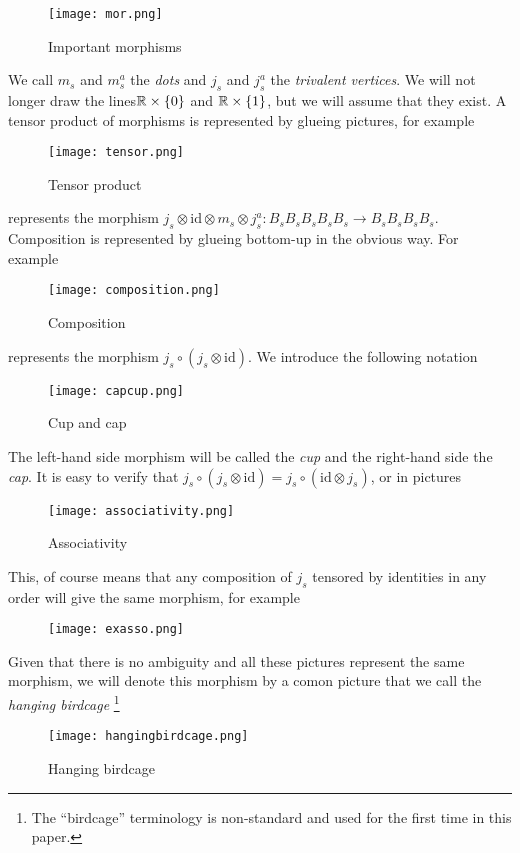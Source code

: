 \documentclass[12pt]{wart}
\theoremstyle{remark}
\begin{document}
 \begin{figure}[H] 
\begin{center}
 \texttt{[image: mor.png]} 
\caption{Important morphisms}  
\end{center}
\end{figure} 
We call $m_s$ and $m_s^a$ the \emph{dots} and $j_s$ and $j_s^a$ the \emph{trivalent vertices}. We will not longer draw the lines$\mathbb R \times \{0\}$ and $\mathbb R \times \{1\}$, but we will assume that they exist. 
A tensor product of morphisms is represented by glueing pictures, for example
 \begin{figure}[H] 
\begin{center}
 \texttt{[image: tensor.png]} 
\caption{Tensor product}  
\end{center}
\end{figure} 
 represents the morphism 
$ j_s\otimes \mathrm{id}\otimes m_s\otimes j_s^a:B_sB_sB_sB_sB_s\rightarrow B_sB_sB_sB_s$.
Composition is represented by glueing  bottom-up in the obvious way. For example 
 \begin{figure}[H] \begin{center}
 \texttt{[image: composition.png]} 
\caption{Composition}  
\end{center}
\end{figure} 
represents the morphism $j_s\circ (j_s\otimes \mathrm{id})$. 
 We introduce the following notation 
\begin{figure}[H] \begin{center}
 \texttt{[image: capcup.png]} 
\caption{Cup and cap}  
\end{center}
\end{figure} 
The left-hand side morphism will be called the \emph{cup} and the right-hand side the \emph{cap}. It is easy to verify that $j_s\circ (j_s\otimes \mathrm{id})=j_s\circ ( \mathrm{id}\otimes j_s)$, or in pictures 
\begin{figure}[H] \begin{center}
 \texttt{[image: associativity.png]} 
\caption{Associativity}  
\end{center}
\end{figure} 
This, of course means that any composition of $j_s$ tensored by identities in any order will give the same morphism, for example 
\begin{figure}[H] \begin{center}
 \texttt{[image: exasso.png]} 
\end{center}
\end{figure} 
Given that there is no ambiguity and all these pictures represent the same morphism, we will denote this morphism by a comon picture that we call the \emph{hanging birdcage} \footnote{The ``birdcage'' terminology is non-standard and used for the first time in this paper.}
\begin{figure}[H] \begin{center}
 \texttt{[image: hangingbirdcage.png]} 
\caption{Hanging birdcage}  
\end{center}
\end{figure} 
\end{document}
